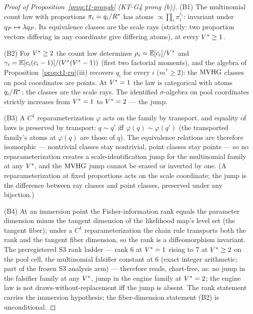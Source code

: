 \begin{proof}[Proof of Proposition~\ref{prop:t1-prongb} (KT-G4 prong (b))]
(B1) The multinomial count law with proportions $\pi_i = q_i/R^{*}$ has
atoms $\propto \prod_i \pi_i^{c_i}$: invariant under $q_{P} \mapsto
\lambda q_{P}$. Its equivalence classes are the scale rays (strictly: two
proportion vectors differing in any coordinate give differing atoms),
at every $V^{*} \geq 1$.

(B2) For $V^{*} \geq 2$ the count law determines
$\rho_i = \mathbb{E}[c_i]/V^{*}$ and $\gamma_i = \mathbb{E}[c_i(c_i -
1)]/(V^{*}(V^{*} - 1))$ (first two factorial moments), and the algebra
of Proposition~\ref{prop:t1-ru}(iii) recovers $q_i$ for every $i$
($m^{*} \geq 2$): the $\operatorname{MVHG}$ classes on pool coordinates are points. At
$V^{*} = 1$ the law is categorical with atoms $q_i/R^{*}$: the classes
are the scale rays. The identified $\sigma$-algebra on pool coordinates
strictly increases from $V^{*} = 1$ to $V^{*} = 2$ --- the jump.

(B3) A $C^{1}$ reparameterization $\varphi$ acts on the family by
transport, and equality of laws is preserved by transport:
$q \sim q'$ iff $\varphi(q) \sim \varphi(q')$ (the transported family's
atoms at $\varphi(q)$ are those of $q$). The equivalence relations are
therefore isomorphic --- nontrivial classes stay nontrivial, point classes
stay points --- so no reparameterization creates a scale-identification
jump for the multinomial family at any $V^{*}$, and the $\operatorname{MVHG}$ jump
cannot be erased or inverted by one. (A reparameterization at fixed
proportions acts on the scale coordinate; the jump is the difference
between ray classes and point classes, preserved under any bijection.)

(B4) At an immersion point the Fisher-information rank equals the
parameter dimension minus the tangent dimension of the likelihood map's
level set (the tangent fiber); under a $C^{1}$ reparameterization the
chain rule transports both the rank and the tangent fiber dimension, so
the rank is a diffeomorphism invariant. The preregistered S3 rank ladder
--- rank $6$ at $V^{*} = 1$ rising to $7$ at $V^{*} \geq 2$ on the pool
cell, the multinomial falsifier constant at $6$ (exact integer arithmetic;
part of the frozen S3 analysis arm) --- therefore reads, chart-free, as:
no jump in the falsifier family at any $V^{*}$, jump in the engine
family at $V^{*} = 2$; the engine law is not draws-without-replacement
iff the jump is absent. The rank statement carries the immersion
hypothesis; the fiber-dimension statement (B2) is unconditional.
\end{proof}

